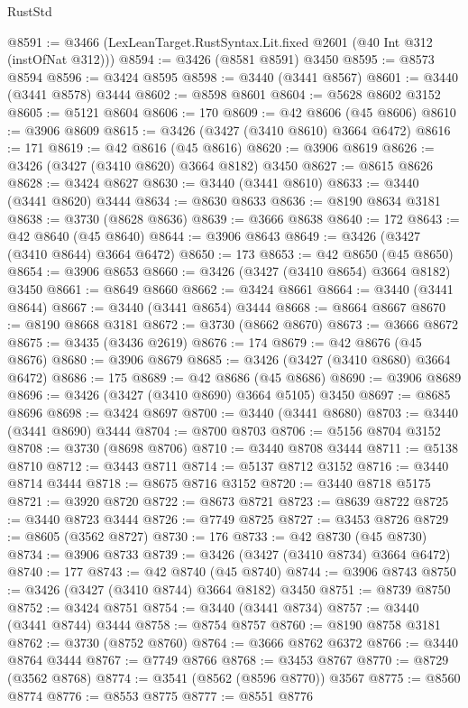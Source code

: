 \begin{lexlean}{RustStd}
\begin{coremodule}
@8591 := @3466 (LexLeanTarget.RustSyntax.Lit.fixed @2601 (@40 Int @312 (instOfNat @312)))
@8594 := @3426 (@8581 @8591) @3450
@8595 := @8573 @8594
@8596 := @3424 @8595
@8598 := @3440 (@3441 @8567)
@8601 := @3440 (@3441 @8578) @3444
@8602 := @8598 @8601
@8604 := @5628 @8602 @3152
@8605 := @5121 @8604
@8606 := 170
@8609 := @42 @8606 (@45 @8606)
@8610 := @3906 @8609
@8615 := @3426 (@3427 (@3410 @8610) @3664 @6472)
@8616 := 171
@8619 := @42 @8616 (@45 @8616)
@8620 := @3906 @8619
@8626 := @3426 (@3427 (@3410 @8620) @3664 @8182) @3450
@8627 := @8615 @8626
@8628 := @3424 @8627
@8630 := @3440 (@3441 @8610)
@8633 := @3440 (@3441 @8620) @3444
@8634 := @8630 @8633
@8636 := @8190 @8634 @3181
@8638 := @3730 (@8628 @8636)
@8639 := @3666 @8638
@8640 := 172
@8643 := @42 @8640 (@45 @8640)
@8644 := @3906 @8643
@8649 := @3426 (@3427 (@3410 @8644) @3664 @6472)
@8650 := 173
@8653 := @42 @8650 (@45 @8650)
@8654 := @3906 @8653
@8660 := @3426 (@3427 (@3410 @8654) @3664 @8182) @3450
@8661 := @8649 @8660
@8662 := @3424 @8661
@8664 := @3440 (@3441 @8644)
@8667 := @3440 (@3441 @8654) @3444
@8668 := @8664 @8667
@8670 := @8190 @8668 @3181
@8672 := @3730 (@8662 @8670)
@8673 := @3666 @8672
@8675 := @3435 (@3436 @2619)
@8676 := 174
@8679 := @42 @8676 (@45 @8676)
@8680 := @3906 @8679
@8685 := @3426 (@3427 (@3410 @8680) @3664 @6472)
@8686 := 175
@8689 := @42 @8686 (@45 @8686)
@8690 := @3906 @8689
@8696 := @3426 (@3427 (@3410 @8690) @3664 @5105) @3450
@8697 := @8685 @8696
@8698 := @3424 @8697
@8700 := @3440 (@3441 @8680)
@8703 := @3440 (@3441 @8690) @3444
@8704 := @8700 @8703
@8706 := @5156 @8704 @3152
@8708 := @3730 (@8698 @8706)
@8710 := @3440 @8708 @3444
@8711 := @5138 @8710
@8712 := @3443 @8711
@8714 := @5137 @8712 @3152
@8716 := @3440 @8714 @3444
@8718 := @8675 @8716 @3152
@8720 := @3440 @8718 @5175
@8721 := @3920 @8720
@8722 := @8673 @8721
@8723 := @8639 @8722
@8725 := @3440 @8723 @3444
@8726 := @7749 @8725
@8727 := @3453 @8726
@8729 := @8605 (@3562 @8727)
@8730 := 176
@8733 := @42 @8730 (@45 @8730)
@8734 := @3906 @8733
@8739 := @3426 (@3427 (@3410 @8734) @3664 @6472)
@8740 := 177
@8743 := @42 @8740 (@45 @8740)
@8744 := @3906 @8743
@8750 := @3426 (@3427 (@3410 @8744) @3664 @8182) @3450
@8751 := @8739 @8750
@8752 := @3424 @8751
@8754 := @3440 (@3441 @8734)
@8757 := @3440 (@3441 @8744) @3444
@8758 := @8754 @8757
@8760 := @8190 @8758 @3181
@8762 := @3730 (@8752 @8760)
@8764 := @3666 @8762 @6372
@8766 := @3440 @8764 @3444
@8767 := @7749 @8766
@8768 := @3453 @8767
@8770 := @8729 (@3562 @8768)
@8774 := @3541 (@8562 (@8596 @8770)) @3567
@8775 := @8560 @8774
@8776 := @8553 @8775
@8777 := @8551 @8776

\end{coremodule}
\end{lexlean}
